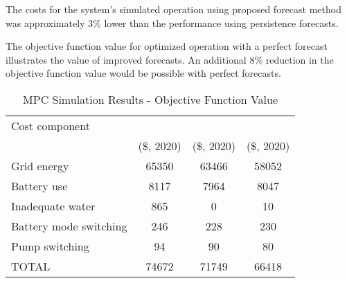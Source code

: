 The costs for the system's simulated operation using proposed forecast method was approximately
3\% lower than the performance using persistence forecasts.

The objective function value for optimized operation with a perfect forecast illustrates the value of improved forecasts.
An additional 8\% reduction in the objective function value would be possible with perfect forecasts.


\begin{table}[!htb]
	\caption{MPC Simulation Results - Objective Function Value}
	\label{table:mpc-simulation-results}
	\centering
	\setlength\tabcolsep{0.6mm}
	\begin{tabular}{lS[table-format=5]S[table-format=5]S[table-format=5]}
		\toprule
		  Cost component
          & {} & {} & {} \\
		  & {(\$, 2020)} & {(\$, 2020)}                    & {(\$, 2020)} \\
		\midrule
		Grid energy            & 65350 & 63466 & 58052 \\
		Battery use            &  8117 &  7964 &  8047 \\
		Inadequate water       &   865 &     0 &    10 \\
		Battery mode switching &   246 &   228 &   230 \\
		Pump switching         &    94 &    90 &    80 \\
		\midrule
		TOTAL                       & 74672 & 71749 & 66418 \\
		\bottomrule
	\end{tabular}
\end{table}

